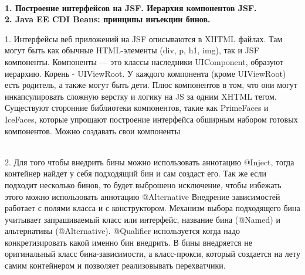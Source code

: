 \documentclass{article}
\newcommand{\bil}[4]{%
    \begin{minipage}{.3\textwidth}
        \textbf{1. #1} \\
        \textbf{2. #2}

        1. #3
        \\
        2. #4
    \end{minipage}
}
\begin{document}
\\
\bil{Построение интерфейсов на JSF. Иерархия компонентов JSF.}{Java EE CDI Beans: принципы инъекции бинов.}{
    Интерфейсы веб приложений на JSF описываются в XHTML файлах. 
    Там могут быть как обычные HTML-элементы (div, p, h1, img), так и JSF компоненты. 
    Компоненты — это классы наследники UIComponent, образуют иерархию. 
    Корень -  UIViewRoot. У каждого компонента (кроме UIViewRoot) есть родитель, а также могут быть дети. 
    Плюс компонентов в том, что они могут инкапсулировать сложную верстку и логику на JS за одним XHTML тегом. 
    Существуют сторонние библиотеки компонентов, такие как PrimeFaces и IceFaces, которые упрощают построение интерфейса обширным набором готовых компонентов. Можно создавать свои компоненты
}{
    Для того чтобы внедрить бины можно использовать аннотацию @Inject, тогда контейнер найдет у себя подходящий бин и сам создаст его. 
    Так же если подходит несколько бинов, то будет выброшено исключение, чтобы избежать этого можно использовать аннотацию @Alternative
    Внедрение зависимостей работает с полями класса и с конструктором. Механизм выбора подходящего бина учитывает запрашиваемый класс или интерфейс, название бина (@Named) и альтернативы (@Alternative). 
    @Qualifier используется когда надо конкретизировать какой именно бин внедрить.
    В бины внедряется не оригинальный класс бина-зависимости, а класс-прокси, который создается на лету самим контейнером и позволяет реализовывать перехватчики.
}
\hfill
\end{document}
